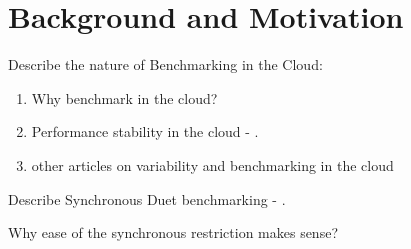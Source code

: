 \chapter{Background and Motivation}
\label{chap:background}

Describe the nature of Benchmarking in the Cloud:

\begin{enumerate}
    \item Why benchmark in the cloud?
    \item Performance stability in the cloud - \citet{laaber2019software}.
    \item other articles on variability and benchmarking in the cloud
\end{enumerate}

Describe Synchronous Duet benchmarking - \citet{bulej2020duet}.

Why ease of the synchronous restriction makes sense?
